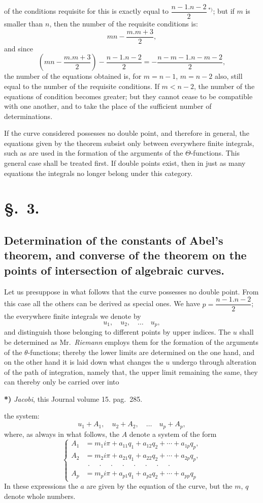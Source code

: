 \documentclass{article}
\begin{document}
of the conditions requisite for this is exactly equal to $\dfrac{n-1.n-2}{2}\,{}^{*)}$; but if $m$ is smaller than $n$, then the number of the requisite conditions is:
\[ mn - \frac{m.m+3}{2}, \]
and since
\[ \left(mn - \frac{m.m+3}{2}\right) - \frac{n-1.n-2}{2} = -\frac{n-m-1.n-m-2}{2}, \]
the number of the equations obtained is, for $m = n-1$, $m = n-2$ also, still equal to the number of the requisite conditions. If $m < n-2$, the number of the equations of condition becomes greater; but they cannot cease to be compatible with one another, and to take the place of the sufficient number of determinations.

If the curve considered possesses no double point, and therefore in general, the equations given by the theorem subsist only between everywhere finite integrals, such as are used in the formation of the arguments of the $\Theta$-functions. This general case shall be treated first. If double points exist, then in just as many equations the integrals no longer belong under this category.

\section*{§.~3.}
\subsection*{Determination of the constants of Abel's theorem, and converse of the theorem on the points of intersection of algebraic curves.}

Let us presuppose in what follows that the curve possesses no double point. From this case all the others can be derived as special ones. We have $p = \dfrac{n-1.n-2}{2}$; the everywhere finite integrals we denote by
\[ u_{1}, \quad u_{2}, \quad \ldots \quad u_{p}, \]
and distinguish those belonging to different points by upper indices. The $u$ shall be determined as Mr.\ \emph{Riemann} employs them for the formation of the arguments of the $\theta$-functions; thereby the lower limits are determined on the one hand, and on the other hand it is laid down what changes the $u$ undergo through alteration of the path of integration, namely that, the upper limit remaining the same, they can thereby only be carried over into

\textbf{*)} \emph{Jacobi}, this Journal volume 15. pag.\ 285.

the system:
\[ u_{1} + A_{1}, \quad u_{2} + A_{2}, \quad \ldots \quad u_{p} + A_{p}, \]
where, as always in what follows, the $A$ denote a system of the form
\[
\left\{
\begin{aligned}
A_{1} &= m_{1}i\pi + a_{11}q_{1} + a_{12}q_{2} + \cdots + a_{1p}q_{p}, \\
A_{2} &= m_{2}i\pi + a_{21}q_{1} + a_{22}q_{2} + \cdots + a_{2p}q_{p}, \\
&\ \cdot\quad\cdot\quad\cdot\quad\cdot\quad\cdot\quad\cdot\quad\cdot\quad\cdot \\
A_{p} &= m_{p}i\pi + a_{p1}q_{1} + a_{p2}q_{2} + \cdots + a_{pp}q_{p}
\end{aligned}
\right.
\tag{5.}
\]
In these expressions the $a$ are given by the equation of the curve, but the $m$, $q$ denote whole numbers.
\end{document}
